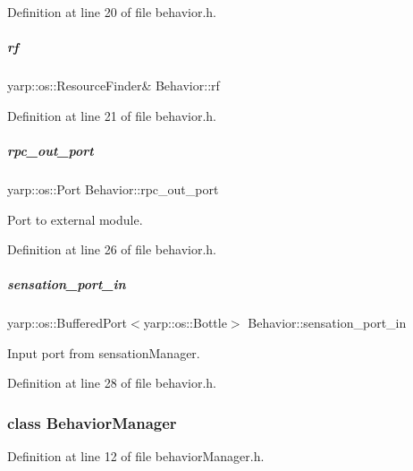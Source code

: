 Definition at line 20 of file behavior.\+h.

\mbox{\label{group__behaviorManager_a789254580a094846e91a9892fa2bc4cd}} 
\subparagraph{\texorpdfstring{rf}{rf}}
{\footnotesize\ttfamily yarp\+::os\+::\+Resource\+Finder\& Behavior\+::rf\hspace{0.3cm}{\ttfamily [protected]}}



Definition at line 21 of file behavior.\+h.

\mbox{\label{group__behaviorManager_a69c34f66f1d96b686e3c220822d42a66}} 
\subparagraph{\texorpdfstring{rpc\+\_\+out\+\_\+port}{rpc\_out\_port}}
{\footnotesize\ttfamily yarp\+::os\+::\+Port Behavior\+::rpc\+\_\+out\+\_\+port}



Port to external module. 



Definition at line 26 of file behavior.\+h.

\mbox{\label{group__behaviorManager_a06324ef0ea01ca50b74f6e3231063482}} 
\subparagraph{\texorpdfstring{sensation\+\_\+port\+\_\+in}{sensation\_port\_in}}
{\footnotesize\ttfamily yarp\+::os\+::\+Buffered\+Port$<$yarp\+::os\+::\+Bottle$>$ Behavior\+::sensation\+\_\+port\+\_\+in}



Input port from sensation\+Manager. 



Definition at line 28 of file behavior.\+h.

\label{classBehaviorManager}
\subsubsection{class Behavior\+Manager}


Definition at line 12 of file behavior\+Manager.\+h.



